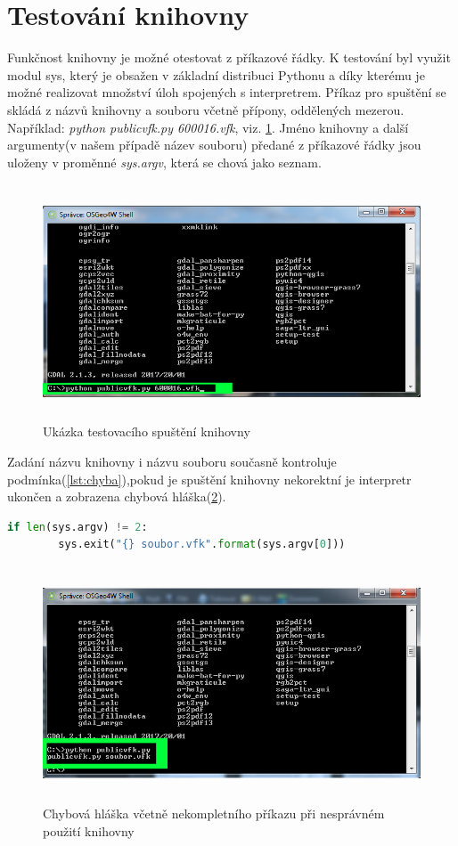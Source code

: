 \section{Testování knihovny}
Funkčnost knihovny je možné otestovat z příkazové řádky. K testování byl využit modul sys, který je obsažen v základní distribuci Pythonu a díky kterému je možné realizovat množství úloh spojených s interpretrem. Příkaz pro spuštění se skládá z názvů knihovny a  souboru včetně přípony, oddělených mezerou. Například: \textit{python publicvfk.py 600016.vfk}, viz. \ref{fig:testovani_ukazka}. Jméno knihovny a další argumenty(v našem případě název  souboru) předané z příkazové řádky jsou uloženy v proměnné \textit{sys.argv}, která se chová jako seznam.

\begin{figure}[H]
	 \centering
      \includegraphics[height=7cm]{./pictures/testovani_ukazka.png}
      \caption{Ukázka testovacího spuštění knihovny}
      \label{fig:testovani_ukazka}
  \end{figure}

Zadání názvu knihovny i názvu  souboru současně kontroluje podmínka(\ref{lst:chyba}),pokud je spuštění knihovny nekorektní je interpretr ukončen a zobrazena chybová hláška(\ref{fig:testovani_hlaska}).
\begin{lstlisting}[caption=Podmínka pro spouštěcí příkaz, language=Python, label=lst:chyba, numbers=none]
    if len(sys.argv) != 2:
        sys.exit("{} soubor.vfk".format(sys.argv[0]))
\end{lstlisting}

\begin{figure}[H]
	 \centering
      \includegraphics[height=7cm]{./pictures/testovani_hlaska.png}
      \caption{Chybová hláška včetně nekompletního příkazu při nesprávném použití knihovny}
      \label{fig:testovani_hlaska}
  \end{figure}

